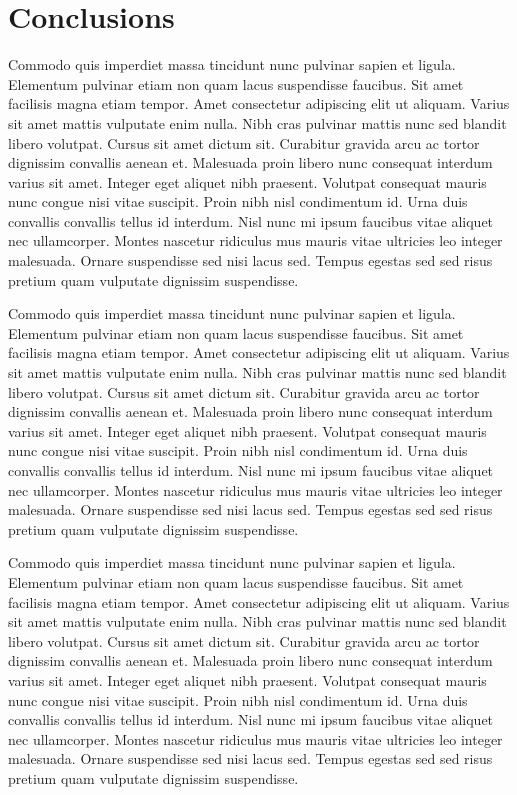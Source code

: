 \chapter{Conclusions}
\label{cha:conclusion}

Commodo quis imperdiet massa tincidunt nunc pulvinar sapien et ligula. Elementum pulvinar etiam non quam lacus suspendisse faucibus. Sit amet facilisis magna etiam tempor. Amet consectetur adipiscing elit ut aliquam. Varius sit amet mattis vulputate enim nulla. Nibh cras pulvinar mattis nunc sed blandit libero volutpat. Cursus sit amet dictum sit. Curabitur gravida arcu ac tortor dignissim convallis aenean et. Malesuada proin libero nunc consequat interdum varius sit amet. Integer eget aliquet nibh praesent. Volutpat consequat mauris nunc congue nisi vitae suscipit. Proin nibh nisl condimentum id. Urna duis convallis convallis tellus id interdum. Nisl nunc mi ipsum faucibus vitae aliquet nec ullamcorper. Montes nascetur ridiculus mus mauris vitae ultricies leo integer malesuada. Ornare suspendisse sed nisi lacus sed. Tempus egestas sed sed risus pretium quam vulputate dignissim suspendisse.

Commodo quis imperdiet massa tincidunt nunc pulvinar sapien et ligula. Elementum pulvinar etiam non quam lacus suspendisse faucibus. Sit amet facilisis magna etiam tempor. Amet consectetur adipiscing elit ut aliquam. Varius sit amet mattis vulputate enim nulla. Nibh cras pulvinar mattis nunc sed blandit libero volutpat. Cursus sit amet dictum sit. Curabitur gravida arcu ac tortor dignissim convallis aenean et. Malesuada proin libero nunc consequat interdum varius sit amet. Integer eget aliquet nibh praesent. Volutpat consequat mauris nunc congue nisi vitae suscipit. Proin nibh nisl condimentum id. Urna duis convallis convallis tellus id interdum. Nisl nunc mi ipsum faucibus vitae aliquet nec ullamcorper. Montes nascetur ridiculus mus mauris vitae ultricies leo integer malesuada. Ornare suspendisse sed nisi lacus sed. Tempus egestas sed sed risus pretium quam vulputate dignissim suspendisse.

Commodo quis imperdiet massa tincidunt nunc pulvinar sapien et ligula. Elementum pulvinar etiam non quam lacus suspendisse faucibus. Sit amet facilisis magna etiam tempor. Amet consectetur adipiscing elit ut aliquam. Varius sit amet mattis vulputate enim nulla. Nibh cras pulvinar mattis nunc sed blandit libero volutpat. Cursus sit amet dictum sit. Curabitur gravida arcu ac tortor dignissim convallis aenean et. Malesuada proin libero nunc consequat interdum varius sit amet. Integer eget aliquet nibh praesent. Volutpat consequat mauris nunc congue nisi vitae suscipit. Proin nibh nisl condimentum id. Urna duis convallis convallis tellus id interdum. Nisl nunc mi ipsum faucibus vitae aliquet nec ullamcorper. Montes nascetur ridiculus mus mauris vitae ultricies leo integer malesuada. Ornare suspendisse sed nisi lacus sed. Tempus egestas sed sed risus pretium quam vulputate dignissim suspendisse.
